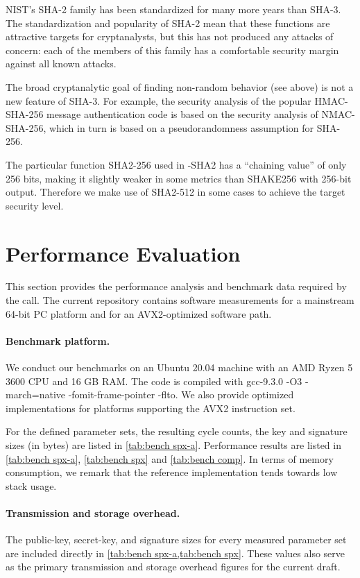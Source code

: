 NIST’s SHA-2 family has been standardized for many more years than SHA-3. The standardization and popularity of SHA-2 mean that these functions are attractive targets for cryptanalysts, but this has not produced any attacks of concern: each of the members of this family has a comfortable security margin against all known attacks.

The broad cryptanalytic goal of finding non-random behavior (see above) is not a new feature of SHA-3. For example, the security analysis of the popular HMAC-SHA-256 message authentication code is based on the security analysis of NMAC-SHA-256, which in turn is based on a pseudorandomness assumption for SHA-256.

The particular function SHA2-256 used in \SPHINCSA-SHA2 has a “chaining value” of only 256 bits, making it slightly weaker in some metrics than SHAKE256 with 256-bit output. Therefore we make use of SHA2-512 in some cases to achieve the target security level.


\section{Performance Evaluation}
\label{sec:performance}

This section provides the performance analysis and benchmark data required by the call. The current repository contains software measurements for a mainstream 64-bit PC platform and for an AVX2-optimized software path.

\paragraph{Benchmark platform.}
We conduct our benchmarks on an Ubuntu 20.04 machine with an AMD Ryzen 5 3600 CPU and 16 GB RAM. The code is compiled with \textsf{gcc-9.3.0 -O3 -march=native -fomit-frame-pointer -flto}. We also provide optimized implementations for platforms supporting the AVX2 instruction set.

For the defined parameter sets, the resulting cycle counts, the key and signature sizes (in bytes) are listed in \cref{tab:bench spx-a}.
Performance results are listed in \cref{tab:bench spx-a}, \cref{tab:bench spx} and \cref{tab:bench comp}. In
terms of memory consumption, we remark that the reference implementation tends towards
low stack usage. 

\paragraph{Transmission and storage overhead.}
The public-key, secret-key, and signature sizes for every measured parameter set are included directly in \cref{tab:bench spx-a,tab:bench spx}. These values also serve as the primary transmission and storage overhead figures for the current draft.


